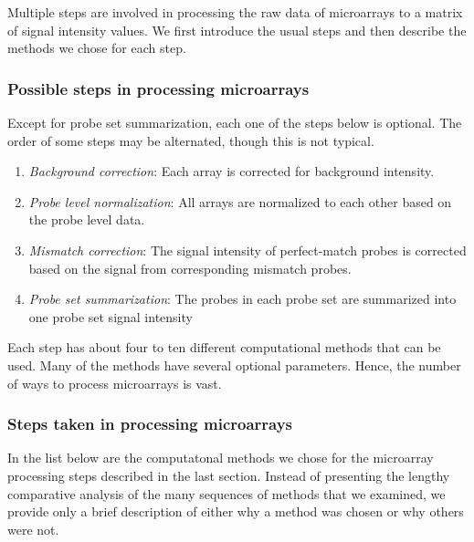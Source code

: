 Multiple steps are involved in processing the raw data of microarrays
to a matrix of signal intensity values. We first 
introduce the usual steps and then describe the methods we chose
for each step.

\subsubsection{Possible steps in processing microarrays}

Except for probe set summarization, each one of the steps below is
optional. The order of some steps may be alternated, though this is not
typical. 

\begin{enumerate}
  \item \emph{Background correction}: Each array is corrected for background intensity.
  \item \emph{Probe level normalization}: All arrays are normalized to each 
  other based on the probe level data.
  \item \emph{Mismatch correction}: The signal intensity of perfect-match probes 
  is corrected based on the signal from corresponding mismatch probes.
  \item \emph{Probe set summarization}: The probes in each probe set are 
  summarized into one probe set signal intensity
\end{enumerate}

Each step has about four to ten different computational
methods that can be used. Many of the methods have several optional parameters.
Hence, the number of ways to process microarrays is vast.

\subsubsection{Steps taken in processing microarrays}

In the list below are the computatonal methods we chose for the microarray
processing steps described in the last section. 
Instead of presenting the lengthy comparative analysis of the many
sequences of methods that we examined, we provide only a brief description of either 
why a method was chosen or why others were not.

